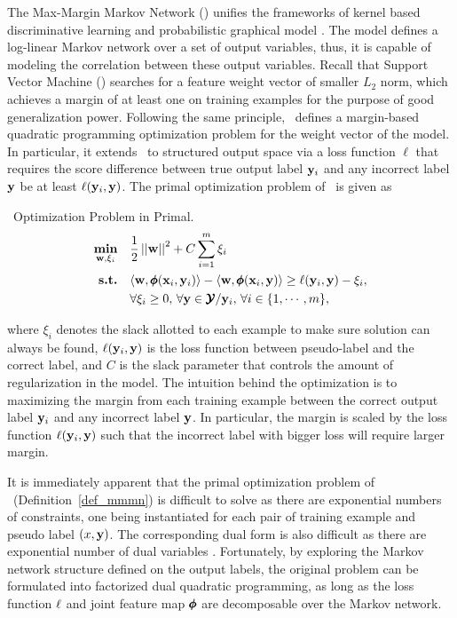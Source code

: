 {The Max-Margin Markov Network (\mmmn) unifies the frameworks of kernel based discriminative learning and probabilistic graphical model \citep{Taskar04max}.
The model defines a log-linear Markov network over a set of output variables, thus, it is capable of modeling the correlation between these output variables.
Recall that Support Vector Machine (\svm) searches for a feature weight vector of smaller $L_2$ norm, which achieves a margin of at least one on training examples for the purpose of good generalization power.
Following the same principle, \mmmn\ defines a margin-based quadratic programming optimization problem for the weight vector of the model.
In particular, it extends \svm\ to structured output space via a loss function $\ell$ that requires the score difference between true output label $\mathbf {y}_i$ and any incorrect label ${\mathbf {y}}$ be at least $\mathbf {\ell}(\mathbf {y}_i,{\mathbf {y}})$.
The primal optimization problem of \mmmn\ is given as
\begin{definition}{\mmmn\ Optimization Problem in Primal.}\label{def_mmmn}
	\begin{align*}
		\underset{\mathbf {w},\mathbf{\xi}_i}{\textbf{min}} & \quad\frac{1}{2}\left|\left| \mathbf {w} \right|\right|^2 + C\sum_{i=1}^{m}\xi_i \\
		\textbf{s.t.} & \quad\langle \mathbf {w}, \pmb \phi(\mathbf {x}_i,\mathbf {y}_i) \rangle - \langle \mathbf {w}, \pmb \phi(\mathbf {x}_i,\mathbf {y}) \rangle \ge \mathbf {\ell}(\mathbf {y}_i,\mathbf {y})-\xi_i,\\
		& \quad \forall \xi_i\ge0,\, \forall \mathbf {y}\in\pmb {\mathcal{Y}}/\mathbf {y}_i,\, \forall i\in\{1,\cdots,m\},
	\end{align*}
\end{definition}
where $\xi_i$ denotes the slack allotted to each example to make sure solution can always be found, $\mathbf {\ell}(\mathbf {y}_i,\mathbf {y})$ is the loss function between pseudo-label and the correct label, and $C$ is the slack parameter that controls the amount of regularization in the model.
The intuition behind the optimization is to maximizing the margin from each training example between the correct output label $\mathbf {y}_i$ and any incorrect label ${\mathbf {y}}$.
In particular, the margin is scaled by the loss function $\mathbf {\ell}(\mathbf {y}_i,{\mathbf {y}})$ such that the incorrect label with bigger loss will require larger margin. 

It is immediately apparent that the primal optimization problem of \mmmn\ (Definition~\ref{def_mmmn}) is difficult to solve as there are exponential numbers of constraints, one being instantiated for each pair of training example and pseudo label $(x,\mathbf {y})$.
The corresponding dual form is also difficult as there are exponential number of dual variables \cite[p.~4]{Taskar04max}.
Fortunately, by exploring the Markov network structure defined on the output labels, the original problem can be formulated into factorized dual quadratic programming, as long as the loss function $\mathbf {\ell}$ and joint feature map $\pmb \phi$ are decomposable over the Markov network.

}
